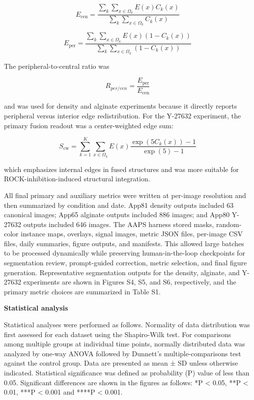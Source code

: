 \documentclass[
]{article}
\begin{document}
\[E_{\text{cen}} = \frac{\sum_{k}^{}{\sum_{x \in \Omega_{k}}^{}E}\left( x \right)C_{k}\left( x \right)}{\sum_{k}^{}{\sum_{x \in \Omega_{k}}^{}C_{k}}\left( x \right)}\]

\[E_{\text{per}} = \frac{\sum_{k}^{}{\sum_{x \in \Omega_{k}}^{}E}\left( x \right)\left( 1 - C_{k}\left( x \right) \right)}{\sum_{k}^{}{\sum_{x \in \Omega_{k}}^{}\left( 1 - C_{k}\left( x \right) \right)}}\]

The peripheral-to-central ratio was

\[R_{per/cen} = \frac{E_{\text{per}}}{E_{\text{cen}}}\]

and was used for density and alginate experiments because it directly reports peripheral versus interior edge redistribution. For the Y-27632 experiment, the primary fusion readout was a center-weighted edge sum:

\[S_{\text{cw}} = \sum_{k = 1}^{K}{\sum_{x \in \Omega_{k}}^{}E}\left( x \right)\frac{\exp\left( 5C_{k}\left( x \right) \right) - 1}{\exp\left( 5 \right) - 1}\]

which emphasizes internal edges in fused structures and was more suitable for ROCK-inhibition-induced structural integration.

All final primary and auxiliary metrics were written at per-image resolution and then summarized by condition and date. App81 density outputs included 63 canonical images; App65 alginate outputs included 886 images; and App80 Y-27632 outputs included 646 images. The AAPS harness stored masks, random-color instance maps, overlays, signal images, metric JSON files, per-image CSV files, daily summaries, figure outputs, and manifests. This allowed large batches to be processed dynamically while preserving human-in-the-loop checkpoints for segmentation review, prompt-guided correction, metric selection, and final figure generation. Representative segmentation outputs for the density, alginate, and Y-27632 experiments are shown in Figures S4, S5, and S6, respectively, and the primary metric choices are summarized in Table S1.

\textbf{Statistical analysis}

Statistical analyses were performed as follows. Normality of data distribution was first assessed for each dataset using the Shapiro-Wilk test. For comparisons among multiple groups at individual time points, normally distributed data was analyzed by one-way ANOVA followed by Dunnett's multiple-comparisons test against the control group. Data are presented as mean ± SD unless otherwise indicated. Statistical significance was defined as probability (P) value of less than 0.05. Significant differences are shown in the figures as follows: *P \textless{} 0.05, **P \textless{} 0.01, ***P \textless{} 0.001 and ****P \textless{} 0.001.
\end{document}

